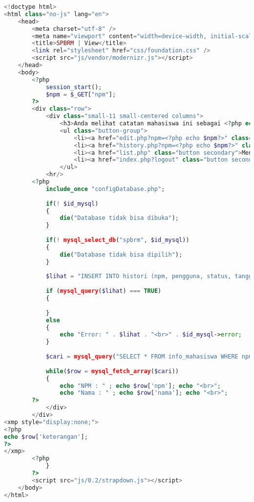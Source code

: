 \begin{lstlisting}[language=php,basicstyle=\tiny,caption=view.php]
<!doctype html>
<html class="no-js" lang="en">
	<head>
		<meta charset="utf-8" />
		<meta name="viewport" content="width=device-width, initial-scale=1.0" />
		<title>SPBRM | View</title>
		<link rel="stylesheet" href="css/foundation.css" />
		<script src="js/vendor/modernizr.js"></script>
	</head>
	<body>
		<?php
			session_start();
			$npm = $_GET["npm"];
		?>
		<div class="row">
			<div class="small-11 small-centered columns">
				<h3>Anda melihat catatan mahasiswa ini sebagai <?php echo $_SESSION['email']?>.</h3>
				<ul class="button-group">
					<li><a href="edit.php?npm=<?php echo $npm?>" class="button secondary">Edit</a></li>
					<li><a href="history.php?npm=<?php echo $npm?>" class="button secondary">Lihat Histori</a></li>
					<li><a href="list.php" class="button secondary">Menu Utama</a></li>
					<li><a href="index.php?logout" class="button secondary">Logout</a></li>
				</ul>
			<hr/>
		<?php
			include_once "configDatabase.php";
			
			if(! $id_mysql)
			{
				die("Database tidak bisa dibuka");
			}
				
			if(! mysql_select_db("spbrm", $id_mysql))
			{
				die("Database tidak bisa dipilih");
			}
			
			$lihat = "INSERT INTO histori (npm, pengguna, status, tanggal_pembaruan, keterangan) VALUES ('". mysql_real_escape_string($npm)  ."', '".$_SESSION['email']."', 'melihat', now(), '')";
			
			if (mysql_query($lihat) === TRUE) 
			{
				
			}
			else
			{
				echo "Error: " . $lihat . "<br>" . $id_mysql->error;
			}
			
			$cari = mysql_query("SELECT * FROM info_mahasiswa WHERE npm='$npm'", $id_mysql);
			
			while($row = mysql_fetch_array($cari))
			{
				echo "NPM : " ; echo $row['npm']; echo "<br>";
				echo "Nama : " ; echo $row['nama']; echo "<br>";
		?>
			</div>
		</div>
<xmp style="display:none;">
<?php
echo $row['keterangan'];
?>
</xmp>
		<?php
			}
		?>
		<script src="js/0.2/strapdown.js"></script>
	</body>
</html>
\end{lstlisting}

